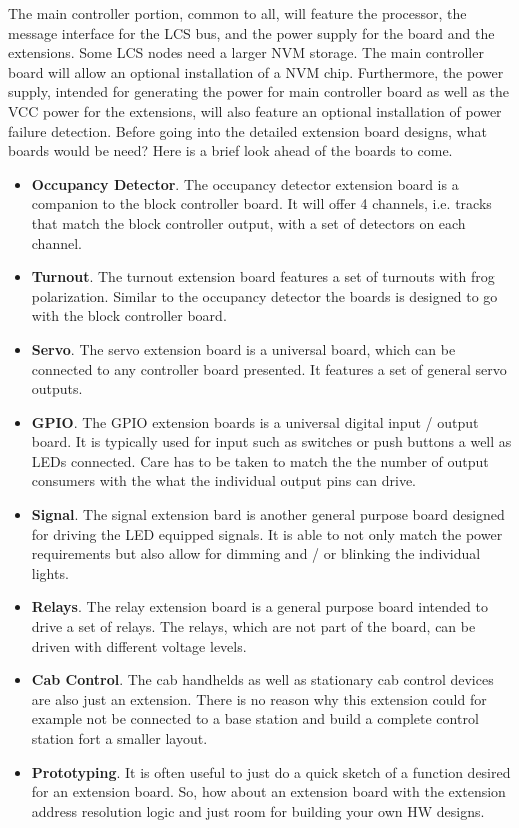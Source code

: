 The main controller portion, common to all, will feature the processor, the message interface for the LCS bus, and the power supply for the board and the extensions. Some LCS nodes need a larger NVM storage. The main controller board will allow an optional installation of a NVM chip. Furthermore, the power supply, intended for generating the power for main controller board as well as the VCC power for the extensions, will also feature an optional installation of power failure detection. Before going into the detailed extension board designs, what boards would be need? Here is a brief look ahead of the boards to come.
\begin{itemize}
\item \textbf{Occupancy Detector}. The occupancy detector extension board is a companion to the block controller board. It will offer 4 channels, i.e. tracks that match the block controller output, with a set of detectors on each channel.
\item \textbf{Turnout}. The turnout extension board features a set of turnouts with frog polarization. Similar to the occupancy detector the boards is designed to go with the block controller board.
\item \textbf{Servo}. The servo extension board is a universal board, which can be connected to any controller board presented. It features a set of general servo outputs.
\item \textbf{GPIO}. The GPIO extension boards is a universal digital input / output board. It is typically used for input such as switches or push buttons a well as LEDs connected. Care has to be taken to match the the number of output consumers with the what the individual output pins can drive.
\item \textbf{Signal}. The signal extension bard is another general purpose board designed for driving the LED equipped signals. It is able to not only match the power requirements but also allow for dimming and / or blinking the individual lights.
\item \textbf{Relays}. The relay extension board is a general purpose board intended to drive a set of relays. The relays, which are not part of the board, can be driven with different voltage levels.
\item \textbf{Cab Control}. The cab handhelds as well as stationary cab control devices are also just an extension. There is no reason why this extension could for example not be connected to a base station and build a complete control station fort a smaller layout.
\item \textbf{Prototyping}. It is often useful to just do a quick sketch of a function desired for an extension board. So, how about an extension board with the extension address resolution logic and just room for building your own HW designs.
\end{itemize}

